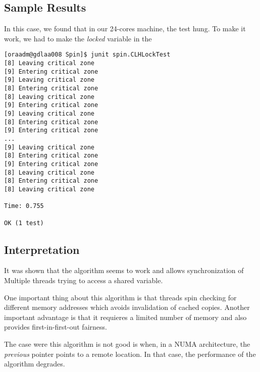 \subsection{Sample Results}
\par
In this case, we found that in our 24-cores machine, the test hung. To make it
work, we had to make the \textit{locked} variable in the 
\par
\hfill
\begin{verbatim}
[oraadm@gdlaa008 Spin]$ junit spin.CLHLockTest 
[8] Leaving critical zone
[9] Entering critical zone
[9] Leaving critical zone
[8] Entering critical zone
[8] Leaving critical zone
[9] Entering critical zone
[9] Leaving critical zone
[8] Entering critical zone
[9] Entering critical zone
...
[9] Leaving critical zone
[8] Entering critical zone
[9] Entering critical zone
[8] Leaving critical zone
[8] Entering critical zone
[8] Leaving critical zone

Time: 0.755

OK (1 test)
\end{verbatim}
\hfill
\par
\subsection{Interpretation}
It was shown that the algorithm seems to work and allows synchronization of
Multiple threads trying to access a shared variable.
\par
One important thing about this algorithm is that threads spin checking for
different memory addresses which avoids invalidation of cached copies. Another
important advantage is that it requieres a limited number of memory and also
provides first-in-first-out fairness. 
\par
The case were this algorithm is not good is when, in a NUMA architecture, the
\textit{previous} pointer points to a remote location. In that case, the
performance of the algorithm degrades.
